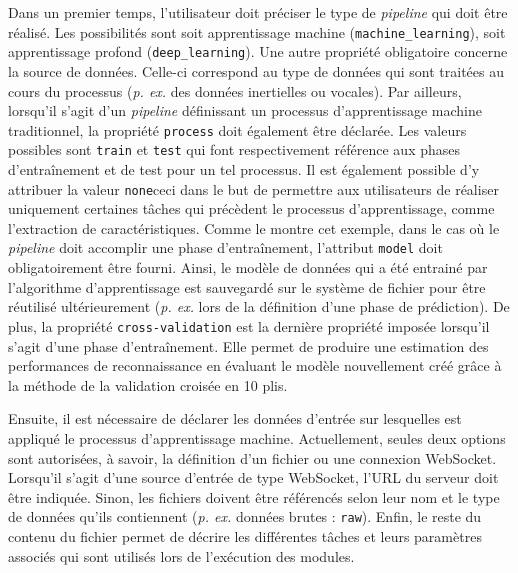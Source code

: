 Dans un premier temps, l'utilisateur doit préciser le type de \textit{pipeline} qui doit être réalisé. Les possibilités sont soit apprentissage machine (\texttt{machine\_learning}), soit apprentissage profond (\texttt{deep\_learning}). Une autre propriété obligatoire concerne la source de données. Celle-ci correspond au type de données qui sont traitées au cours du processus (\textit{p. ex.} des données inertielles ou vocales). Par ailleurs, lorsqu'il s'agit d'un \textit{pipeline} définissant un processus d'apprentissage machine traditionnel, la propriété \texttt{process} doit également être déclarée. Les valeurs possibles sont \texttt{train} et \texttt{test} qui font respectivement référence aux phases d'entraînement et de test pour un tel processus. Il est également possible d'y attribuer la valeur \texttt{none}\textemdash ceci dans le but de permettre aux utilisateurs de réaliser uniquement certaines tâches qui précèdent le processus d'apprentissage, comme l'extraction de caractéristiques. Comme le montre cet exemple, dans le cas où le \textit{pipeline} doit accomplir une phase d'entraînement, l'attribut \texttt{model} doit obligatoirement être fourni. Ainsi, le modèle de données qui a été entrainé par l'algorithme d'apprentissage est sauvegardé sur le système de fichier pour être réutilisé ultérieurement (\textit{p. ex.} lors de la définition d'une phase de prédiction). De plus, la propriété \texttt{cross-validation} est la dernière propriété imposée lorsqu'il s'agit d'une phase d'entraînement. Elle permet de produire une estimation des performances de reconnaissance en évaluant le modèle nouvellement créé grâce à la méthode de la validation croisée en 10 plis.

Ensuite, il est nécessaire de déclarer les données d'entrée sur lesquelles est appliqué le processus d'apprentissage machine. Actuellement, seules deux options sont autorisées, à savoir, la définition d'un fichier ou une connexion WebSocket. Lorsqu'il s'agit d'une source d'entrée de type WebSocket, l'\acs{URL} du serveur doit être indiquée. Sinon, les fichiers doivent être référencés selon leur nom et le type de données qu'ils contiennent (\textit{p. ex.} données brutes : \texttt{raw}). Enfin, le reste du contenu du fichier permet de décrire les différentes tâches et leurs paramètres associés qui sont utilisés lors de l'exécution des modules.

